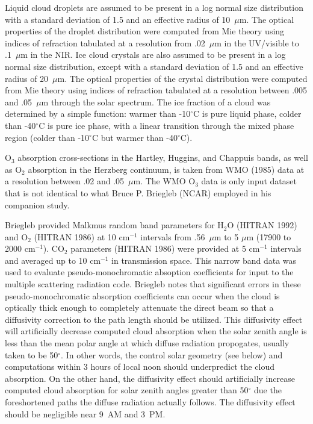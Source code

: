 Liquid cloud droplets are assumed to be present in a log normal size
distribution with a standard deviation of 1.5 and an effective radius
of 10~$\mu$m.  The optical properties of the droplet distribution
were computed from Mie theory using indices of refraction tabulated at
a resolution from .02~$\mu$m in the UV/visible to .1~$\mu$m in the
NIR.  Ice cloud crystals are also assumed to be present in a log
normal size distribution, except with a standard deviation of 1.5 and
an effective radius of 20~$\mu$m.  The optical properties of the
crystal distribution were computed from Mie theory using indices of
refraction tabulated at a resolution between .005 and .05~$\mu$m
through the solar spectrum. The ice fraction of a cloud was determined
by a simple function: warmer than -10$^\circ$C is pure liquid phase,
colder than -40$^\circ$C is pure ice phase, with a linear transition
through the mixed phase region (colder than -10$^\circ$C but warmer
than -40$^\circ$C). 

O$_3$ absorption cross-sections in the Hartley, Huggins, and Chappuis
bands, as well as O$_2$ absorption in the Herzberg continuum, is taken
from WMO (1985) data at a resolution between .02 and .05~$\mu$m. 
The WMO O$_3$ data is only input dataset that is not identical
to what Bruce P. Briegleb (NCAR) employed in his companion
study. 

Briegleb provided Malkmus random band parameters for H$_2$O (HITRAN
1992) and O$_2$ (HITRAN 1986)
at 10 cm$^{-1}$ intervals from .56~$\mu$m to 5
$\mu$m (17900 to 2000 cm$^{-1}$).  
CO$_2$ parameters (HITRAN 1986) were provided at 5 cm$^{-1}$ intervals
and averaged up to 10 cm$^{-1}$ in transmission space.
This narrow band data was used to
evaluate pseudo-monochromatic absoption coefficients for input to the
multiple scattering radiation code. 
Briegleb notes that significant
errors in these pseudo-monochromatic absorption coefficients can occur
when the cloud is optically thick enough to completely attenuate the
direct beam so that a diffusivity correction to the path length
should be utilized. 
This diffusivity effect will artificially decrease computed cloud
absorption when the solar zenith angle is less than  
the mean polar angle at which diffuse radiation propogates, usually
taken to be 50$^\circ$. 
In other words, the control solar geometry (see below) and 
computations within 3 hours of local noon 
should underpredict the cloud absorption. 
On the other hand, the
diffusivity effect should artificially increase computed cloud
absorption for solar zenith angles greater than 50$^\circ$ due the
foreshortened paths the diffuse radiation actually follows.
The diffusivity effect should be negligible near 9~AM and 3~PM.

